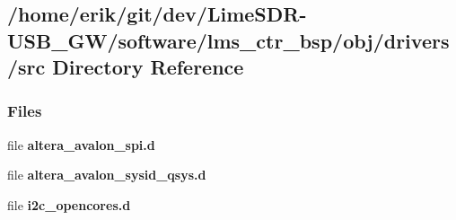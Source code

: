 \subsection{/home/erik/git/dev/\+Lime\+S\+D\+R-\/\+U\+S\+B\+\_\+\+G\+W/software/lms\+\_\+ctr\+\_\+bsp/obj/drivers/src Directory Reference}
\label{dir_04b1cde95e0bd6d447badb6fdafd433e}
\subsubsection*{Files}
\begin{DoxyCompactItemize}
\item 
file {\bf altera\+\_\+avalon\+\_\+spi.\+d}
\item 
file {\bf altera\+\_\+avalon\+\_\+sysid\+\_\+qsys.\+d}
\item 
file {\bf i2c\+\_\+opencores.\+d}
\end{DoxyCompactItemize}
